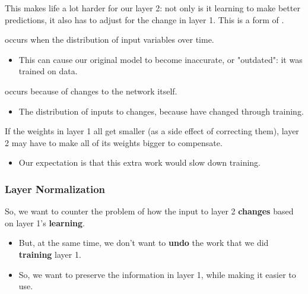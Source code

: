             This makes life a lot harder for our layer 2: not only is it learning to make better predictions, it also has to adjust for the change in layer 1. This is a form of .\\
    
            \begin{definition}
                 occurs when the distribution of input variables  over time. 
    
                \begin{itemize}
                    \item This can cause our original model to become inaccurate, or "outdated": it was trained on  data.
                \end{itemize}
    
                 occurs because of changes to the network itself.
                
                \begin{itemize}
                    \item The distribution of inputs to  changes, because  have changed through training.
                \end{itemize}
            \end{definition}
    
            \miniex If the weights in layer 1 all get smaller (as a side effect of correcting them), layer 2 may have to make all of its weights bigger to compensate.
            
            \begin{itemize}
                \item Our expectation is that this extra work would slow down training.
            \end{itemize}

        \subsubsection{Layer Normalization}

            So, we want to counter the problem of how the input to layer 2 \textbf{changes} based on layer 1's \textbf{learning}.

            \begin{itemize}
                \item But, at the same time, we don't want to \textbf{undo} the work that we did \textbf{training} layer 1.
                \item So, we want to preserve the information in layer 1, while making it easier to use.
            \end{itemize}

